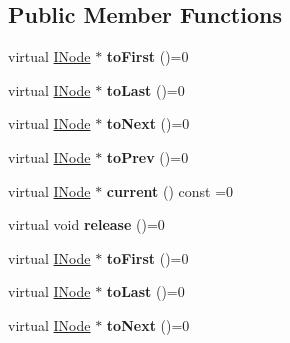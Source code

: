 \subsection*{Public Member Functions}
\begin{DoxyCompactItemize}
\item 
\mbox{\label{class_i_node_iterator_ac7b3a8977f80aec8734dc28d4ba4919d}} 
virtual \mbox{\hyperlink{class_i_node}{I\+Node}} $\ast$ {\bfseries to\+First} ()=0
\item 
\mbox{\label{class_i_node_iterator_ae28f1e6d24099d5cfa7e27b8ee0214c6}} 
virtual \mbox{\hyperlink{class_i_node}{I\+Node}} $\ast$ {\bfseries to\+Last} ()=0
\item 
\mbox{\label{class_i_node_iterator_ab6ae57027122c245553a626af7d1f763}} 
virtual \mbox{\hyperlink{class_i_node}{I\+Node}} $\ast$ {\bfseries to\+Next} ()=0
\item 
\mbox{\label{class_i_node_iterator_a484ecacf81a01d3c7400b019b23a74c3}} 
virtual \mbox{\hyperlink{class_i_node}{I\+Node}} $\ast$ {\bfseries to\+Prev} ()=0
\item 
\mbox{\label{class_i_node_iterator_a786c0a482f472d6436839bbf08484a81}} 
virtual \mbox{\hyperlink{class_i_node}{I\+Node}} $\ast$ {\bfseries current} () const =0
\item 
\mbox{\label{class_i_node_iterator_a17249e1a53de824e53367fdb4ad7b201}} 
virtual void {\bfseries release} ()=0
\item 
\mbox{\label{class_i_node_iterator_ac7b3a8977f80aec8734dc28d4ba4919d}} 
virtual \mbox{\hyperlink{class_i_node}{I\+Node}} $\ast$ {\bfseries to\+First} ()=0
\item 
\mbox{\label{class_i_node_iterator_ae28f1e6d24099d5cfa7e27b8ee0214c6}} 
virtual \mbox{\hyperlink{class_i_node}{I\+Node}} $\ast$ {\bfseries to\+Last} ()=0
\item 
\mbox{\label{class_i_node_iterator_ab6ae57027122c245553a626af7d1f763}} 
virtual \mbox{\hyperlink{class_i_node}{I\+Node}} $\ast$ {\bfseries to\+Next} ()=0

\end{DoxyCompactItemize}
